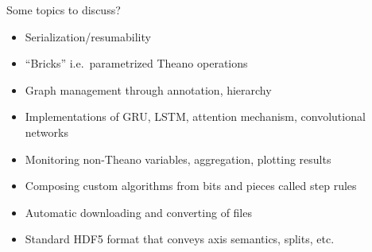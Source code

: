 \documentclass[twoside,11pt]{article}
\begin{document}
Some topics to discuss?

\begin{itemize}
  \item Serialization/resumability
  \item ``Bricks'' i.e.\ parametrized Theano operations
  \item Graph management through annotation, hierarchy
  \item Implementations of GRU, LSTM, attention mechanism, convolutional
  networks
  \item Monitoring non-Theano variables, aggregation, plotting results
  \item Composing custom algorithms from bits and pieces
      called step rules
\end{itemize}

\begin{itemize}
  \item Automatic downloading and converting of files
  \item Standard HDF5 format that conveys axis semantics, splits, etc.
\end{itemize}






\end{document}
